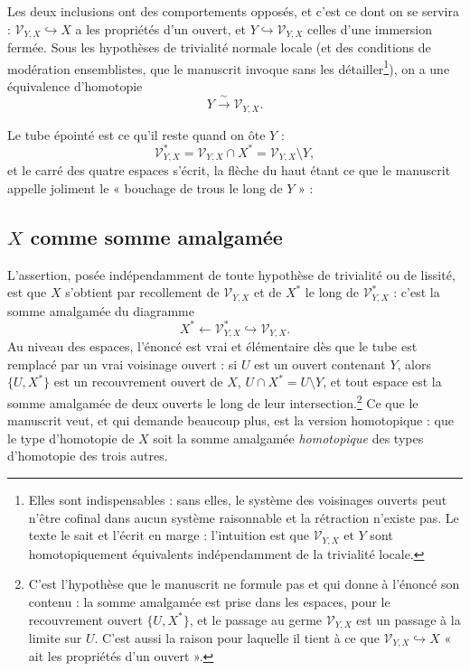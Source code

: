 \documentclass[11pt,a4paper]{article}
\begin{document}
Les deux inclusions ont des comportements opposés, et c'est ce dont
on se servira : $\mathcal{V}_{Y,X} \hookrightarrow X$ a les propriétés d'un
ouvert, et $Y \hookrightarrow \mathcal{V}_{Y,X}$ celles d'une immersion fermée.
Sous les hypothèses de trivialité normale locale (et des conditions de
modération ensemblistes, que le manuscrit invoque sans les
détailler\footnote{Elles sont indispensables : sans elles, le système des
voisinages ouverts peut n'être cofinal dans aucun système raisonnable et la
rétraction n'existe pas. Le texte le sait et l'écrit en marge : l'intuition est
que $\mathcal{V}_{Y,X}$ et $Y$ sont homotopiquement équivalents indépendamment de
la trivialité locale.}), on a une équivalence d'homotopie
\[
  Y \xrightarrow{\ \sim\ } \mathcal{V}_{Y,X}.
\]

Le tube épointé est ce qu'il reste quand on ôte $Y$ :
\[
  \mathcal{V}^{*}_{Y,X} = \mathcal{V}_{Y,X} \cap X^{*}
  = \mathcal{V}_{Y,X} \setminus Y,
\]
et le carré des quatre espaces s'écrit, la flèche du haut étant ce que le
manuscrit appelle joliment le « bouchage de trous le long de $Y$ » :


\subsection*{$X$ comme somme amalgamée}

L'assertion, posée indépendamment de toute hypothèse de trivialité ou de
lissité, est que $X$ s'obtient par recollement de $\mathcal{V}_{Y,X}$ et de
$X^{*}$ le long de $\mathcal{V}^{*}_{Y,X}$ : c'est la somme amalgamée du
diagramme
\[
  X^{*} \longleftarrow \mathcal{V}^{*}_{Y,X} \hookrightarrow \mathcal{V}_{Y,X}.
\]
Au niveau des espaces, l'énoncé est vrai et élémentaire dès que le tube est
remplacé par un vrai voisinage ouvert : si $U$ est un ouvert contenant $Y$,
alors $\{U, X^{*}\}$ est un recouvrement ouvert de $X$, $U \cap X^{*} = U
\setminus Y$, et tout espace est la somme amalgamée de deux ouverts le long de
leur intersection.\footnote{C'est l'hypothèse que le manuscrit ne formule pas et
qui donne à l'énoncé son contenu : la somme amalgamée est prise dans les
espaces, pour le recouvrement ouvert $\{U,X^{*}\}$, et le passage au germe
$\mathcal{V}_{Y,X}$ est un passage à la limite sur $U$. C'est aussi la raison
pour laquelle il tient à ce que $\mathcal{V}_{Y,X} \hookrightarrow X$ « ait les
propriétés d'un ouvert ».} Ce que le manuscrit veut, et qui demande beaucoup
plus, est la version homotopique : que le type d'homotopie de $X$ soit la somme
amalgamée \emph{homotopique} des types d'homotopie des trois autres.
\end{document}

